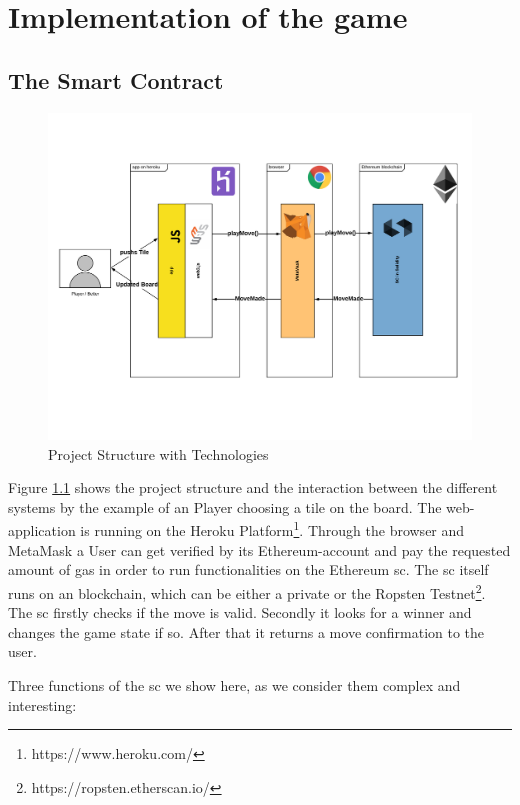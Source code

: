 \chapter{Implementation of the game}\label{ch:implementation}
\section{The Smart Contract}
	\begin{figure}[ht]
		\begin{center}
			\includegraphics[scale=0.4]{res/project_structure}
		\end{center}
		\caption{Project Structure with Technologies}
		\label{fig:project_structure}
	\end{figure}	
Figure \ref{fig:project_structure} shows the project structure and the interaction between the different systems by the example of an Player choosing a tile on the board.
The web-application is running on the Heroku Platform\footnote{https://www.heroku.com/}. Through the browser and MetaMask a User can get verified by its Ethereum-account and pay the requested amount of gas in order to run functionalities on the Ethereum \ac{sc}. The \ac{sc} itself runs on an blockchain, which can be either a private or the Ropsten Testnet\footnote{https://ropsten.etherscan.io/}.\\
The \ac{sc} firstly checks if the move is valid. Secondly it looks for a winner and changes the game state if so. After that it returns a move confirmation to the user.

Three functions of the \ac{sc} we show here, as we consider them complex and interesting:\\





